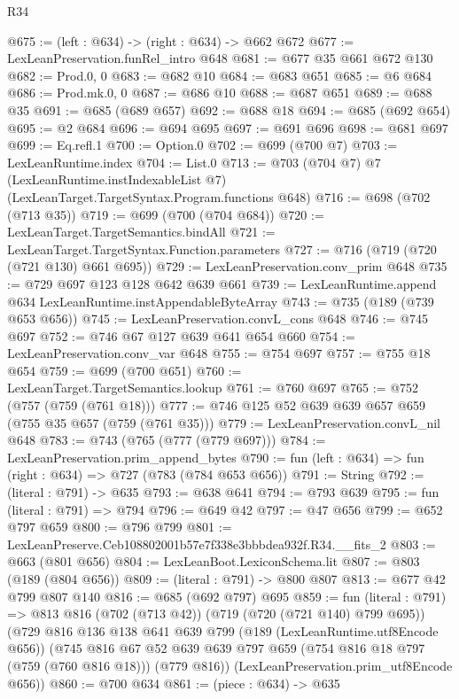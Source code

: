 \begin{lexlean}{R34}
\begin{coremodule}
@675 := (left : @634) -> (right : @634) -> @662 @672
@677 := LexLeanPreservation.funRel_intro @648
@681 := @677 @35 @661 @672 @130
@682 := Prod.{0, 0}
@683 := @682 @10
@684 := @683 @651
@685 := @6 @684
@686 := Prod.mk.{0, 0}
@687 := @686 @10
@688 := @687 @651
@689 := @688 @35
@691 := @685 (@689 @657)
@692 := @688 @18
@694 := @685 (@692 @654)
@695 := @2 @684
@696 := @694 @695
@697 := @691 @696
@698 := @681 @697
@699 := Eq.refl.{1}
@700 := Option.{0}
@702 := @699 (@700 @7)
@703 := LexLeanRuntime.index
@704 := List.{0}
@713 := @703
    (@704 @7)
    @7
    (LexLeanRuntime.instIndexableList @7)
    (LexLeanTarget.TargetSyntax.Program.functions @648)
@716 := @698 (@702 (@713 @35))
@719 := @699 (@700 (@704 @684))
@720 := LexLeanTarget.TargetSemantics.bindAll
@721 := LexLeanTarget.TargetSyntax.Function.parameters
@727 := @716 (@719 (@720 (@721 @130) @661 @695))
@729 := LexLeanPreservation.conv_prim @648
@735 := @729 @697 @123 @128 @642 @639 @661
@739 := LexLeanRuntime.append @634 LexLeanRuntime.instAppendableByteArray
@743 := @735 (@189 (@739 @653 @656))
@745 := LexLeanPreservation.convL_cons @648
@746 := @745 @697
@752 := @746 @67 @127 @639 @641 @654 @660
@754 := LexLeanPreservation.conv_var @648
@755 := @754 @697
@757 := @755 @18 @654
@759 := @699 (@700 @651)
@760 := LexLeanTarget.TargetSemantics.lookup
@761 := @760 @697
@765 := @752 (@757 (@759 (@761 @18)))
@777 := @746 @125 @52 @639 @639 @657 @659 (@755 @35 @657 (@759 (@761 @35)))
@779 := LexLeanPreservation.convL_nil @648
@783 := @743 (@765 (@777 (@779 @697)))
@784 := LexLeanPreservation.prim_append_bytes
@790 := fun (left : @634) => fun (right : @634) => @727 (@783 (@784 @653 @656))
@791 := String
@792 := (literal : @791) -> @635
@793 := @638 @641
@794 := @793 @639
@795 := fun (literal : @791) => @794
@796 := @649 @42
@797 := @47 @656
@799 := @652 @797 @659
@800 := @796 @799
@801 := LexLeanPreserve.Ceb108802001b57e7f338e3bbbdea932f.R34.__fits_2
@803 := @663 (@801 @656)
@804 := LexLeanBoot.LexiconSchema.lit
@807 := @803 (@189 (@804 @656))
@809 := (literal : @791) -> @800 @807
@813 := @677 @42 @799 @807 @140
@816 := @685 (@692 @797) @695
@859 := fun (literal : @791) =>
  @813
    @816
    (@702 (@713 @42))
    (@719 (@720 (@721 @140) @799 @695))
    (@729
      @816
      @136
      @138
      @641
      @639
      @799
      (@189 (LexLeanRuntime.utf8Encode @656))
      (@745
        @816
        @67
        @52
        @639
        @639
        @797
        @659
        (@754 @816 @18 @797 (@759 (@760 @816 @18)))
        (@779 @816))
      (LexLeanPreservation.prim_utf8Encode @656))
@860 := @700 @634
@861 := (piece : @634) -> @635

\end{coremodule}
\end{lexlean}
